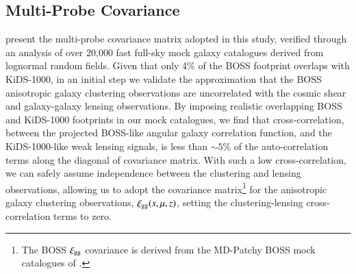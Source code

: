 \subsection{Multi-Probe Covariance}
\label{sec:Cov}
\citet{joachimi/etal:inprep} present the multi-probe covariance matrix adopted in this study, verified through an analysis of over 20,000 fast full-sky mock galaxy catalogues derived from lognormal random fields.   Given that only 4\% of the BOSS footprint overlaps with KiDS-1000, in an initial step we validate the approximation that the BOSS anisotropic galaxy clustering observations are uncorrelated with the cosmic shear and galaxy-galaxy lensing observations.   By imposing realistic overlapping BOSS and KiDS-1000 footprints in our mock catalogues, we find that cross-correlation, between the projected BOSS-like angular galaxy correlation function, and the KiDS-1000-like weak lensing signals, is less than $\sim 5\%$ of the auto-correlation terms along the diagonal of covariance matrix.  With such a low cross-correlation, we can safely assume independence between the clustering and lensing observations, allowing us to adopt the \citet{sanchez/etal:2017} covariance matrix\footnote{The BOSS $\xi_{\rm gg}$ covariance is derived from the {\sc MD-Patchy} BOSS mock catalogues of \citet{kitaura/etal:2016}.} for the anisotropic galaxy clustering observations, $\xi_{\rm gg}(s,\mu,z)$, setting the clustering-lensing cross-correlation terms to zero.   


